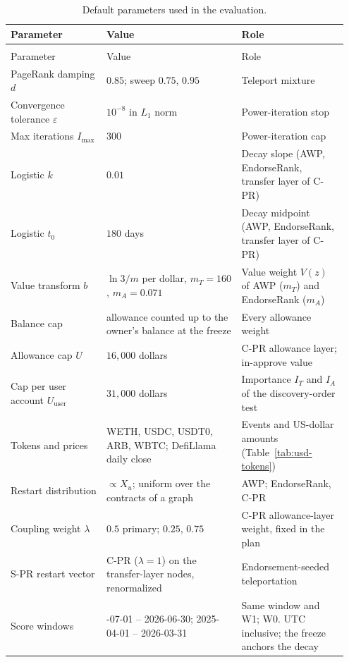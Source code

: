 {\footnotesize{}\setlength{\tabcolsep}{4pt}%
\begin{longtable}{@{}>{\raggedright\arraybackslash}p{0.27\linewidth}>{\raggedright\arraybackslash}p{0.38\linewidth}>{\raggedright\arraybackslash}p{0.30\linewidth}@{}}
\caption{Default parameters used in the evaluation.}\label{tab:parameter-summary}\\
\toprule
Parameter & Value & Role \\
\midrule
\endfirsthead
\multicolumn{3}{l}{\small Table~\thetable\ (continued)}\\
\toprule
Parameter & Value & Role \\
\midrule
\endhead
\bottomrule
\endfoot
PageRank damping $d$ & $0.85$; sweep $0.75$, $0.95$ & Teleport mixture \\
Convergence tolerance $\varepsilon$ & $10^{-8}$ in $L_1$ norm & Power-iteration stop \\
Max iterations $I_{\max}$ & $300$ & Power-iteration cap \\
Logistic $k$ & $0.01$ & Decay slope (AWP, EndorseRank, transfer layer of \mbox{C-PR}) \\
Logistic $t_0$ & $180$ days & Decay midpoint (AWP, EndorseRank, transfer layer of \mbox{C-PR}) \\
Value transform $b$ & $\ln 3/m$ per dollar, $m_T=160$, $m_A=0.071$ & Value weight $V(z)$ of AWP ($m_T$) and EndorseRank ($m_A$) \\
Balance cap & allowance counted up to the owner's balance at the freeze & Every allowance weight \\
Allowance cap $U$ & $16{,}000$ dollars & \mbox{C-PR} allowance layer; in-approve value \\
Cap per user account $U_{\mathrm{user}}$ & $31{,}000$ dollars & Importance $I_T$ and $I_A$ of the discovery-order test \\
Tokens and prices & WETH, USDC, USDT0, ARB, WBTC; DefiLlama daily close & Events and US-dollar amounts (Table~\ref{tab:usd-tokens}) \\
Restart distribution & $\propto X_u$; uniform over the contracts of a graph & AWP; EndorseRank, \mbox{C-PR} \\
Coupling weight $\lambda$ & $0.5$ primary; $0.25$, $0.75$ & \mbox{C-PR} allowance-layer weight, fixed in the plan \\
\mbox{S-PR} restart vector & \mbox{C-PR} ($\lambda=1$) on the transfer-layer nodes, renormalized & Endorsement-seeded teleportation \\
Score windows & 2025-07-01 -- 2026-06-30; 2025-04-01 -- 2026-03-31 & Same window and W1; W0. UTC inclusive; the freeze anchors the decay \\

\end{longtable}}
